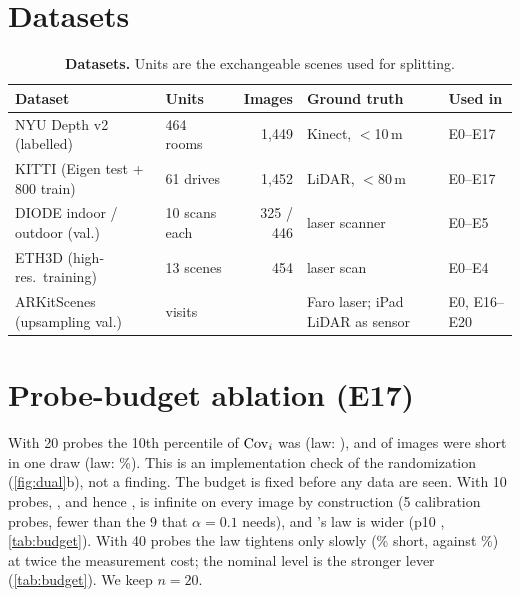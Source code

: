 \section{Datasets}
\label{app:data}
\begin{table}[h]
\centering\small
\caption{\textbf{Datasets.} Units are the exchangeable scenes used for splitting.}
\label{tab:data}
\setlength{\tabcolsep}{3pt}
\begin{tabular}{@{}llrll@{}}
\toprule
Dataset & Units & Images & Ground truth & Used in \\
\midrule
NYU Depth v2 (labelled) & 464 rooms & 1{,}449 & Kinect, $<$10\,m & E0--E17 \\
KITTI (Eigen test + 800 train) & 61 drives & 1{,}452 & LiDAR, $<$80\,m & E0--E17 \\
DIODE indoor / outdoor (val.) & 10 scans each & 325 / 446 & laser scanner & E0--E5 \\
ETH3D (high-res.\ training) & 13 scenes & 454 & laser scan & E0--E4 \\
ARKitScenes (upsampling val.) & \NumArkVisits{} visits & \NumArkFrames{} & Faro laser; iPad LiDAR as sensor & E0, E16--E20 \\
\bottomrule
\end{tabular}
\end{table}

\section{Probe-budget ablation (E17)}
\label{app:budget}
With 20 probes the 10th percentile of $\mathrm{Cov}_i$ was \NumMeasPTenTwenty{} (law: \NumBetaPTenTwenty), and \NumESeventeenShort{} of images were short in one draw (law: \NumBetaShortOneTwenty\%).
This is an implementation check of the randomization (\cref{fig:dual}b), not a finding.
The budget is fixed before any data are seen.
With 10 probes, \mLocalSplit, and hence \mDistBoth, is infinite on every image by construction (5 calibration probes, fewer than the 9 that $\alpha=0.1$ needs), and \mDual's law is wider (p10 \NumBetaPTenTen, \cref{tab:budget}).
With 40 probes the law tightens only slowly (\NumBetaShortOneForty\% short, against \NumBetaShortOneTwenty\%) at twice the measurement cost; the nominal level is the stronger lever (\cref{tab:budget}). We keep $n=20$.


